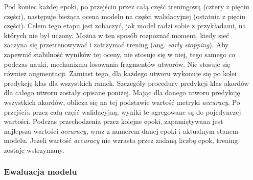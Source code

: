 Pod koniec każdej epoki, po przejściu przez całą część treningową (cztery z pięciu części),
następuje bieżąca ocena modelu na części walidacyjnej (ostatnia z pięciu części). Celem tego etapu
jest zobaczyć, jak model radzi sobie z przykładami, na których nie był uczony. Można w ten sposób
rozpoznać moment, kiedy sieć zaczyna się przetrenowywać i zatrzymać trening (ang. \emph{early
stopping}). Aby zapewnić stabilność wyników tej oceny, nie stosuje się w niej, tego samego co
podczas nauki, mechanizmu losowania fragmentów utworów. Nie stosuje się również augmentacji. Zamiast
tego, dla każdego utworu wykonuje się po kolei predykcję klas dla wszystkich ramek. Szczegóły
procedury predykcji klas akordów dla całego utworu zostały opisane poniżej. Mając dla danego utworu
predykcję wszystkich akordów, oblicza się na tej podstawie wartość metryki \emph{accuracy}. Po
przejściu przez całą część walidacyjną, wyniki te agregowane są do pojedynczej wartości. Podczas
przechodzenia przez kolejne epoki, zapamiętywana jest najlepsza wartości \emph{accuracy}, wraz z
numerem danej epoki i aktualnym stanem modelu. Jeżeli wartość \emph{accuracy} nie wzrasta przez
zadaną liczbę epok, trening zostaje wstrzymany.

\subsubsection{Ewaluacja modelu}

